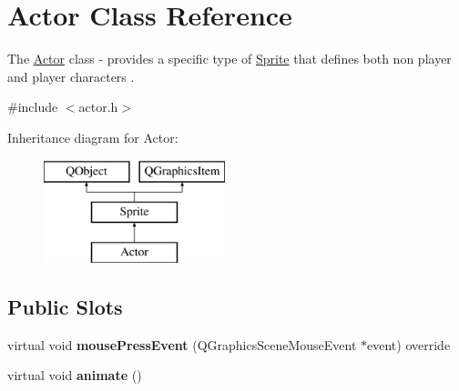 \hypertarget{class_actor}{}\section{Actor Class Reference}
\label{class_actor}


The \hyperlink{class_actor}{Actor} class -\/ provides a specific type of \hyperlink{class_sprite}{Sprite} that defines both non player and player characters .  




{\ttfamily \#include $<$actor.\+h$>$}

Inheritance diagram for Actor\+:\begin{figure}[H]
\begin{center}
\leavevmode
\includegraphics[height=3.000000cm]{class_actor}
\end{center}
\end{figure}
\subsection*{Public Slots}
\begin{DoxyCompactItemize}
\item 
\mbox{\label{class_actor_abfb178899dad2f9e42f16280c7fe31e6}} 
virtual void {\bfseries mouse\+Press\+Event} (Q\+Graphics\+Scene\+Mouse\+Event $\ast$event) override
\item 
\mbox{\label{class_actor_a94254c47676f41349dbbdd8d77f8e9a8}} 
virtual void {\bfseries animate} ()
\end{DoxyCompactItemize}

